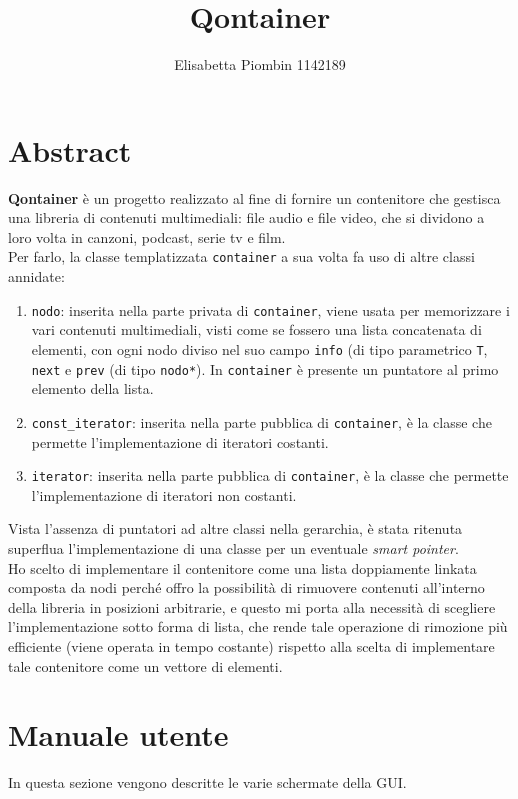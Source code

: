 \documentclass[a4paper,10pt]{article}
\begin{document}
\title {Qontainer}
\author {Elisabetta Piombin 1142189}
\date{}

\maketitle
\tableofcontents
\clearpage\mbox{}

\section{Abstract}
\textbf{Qontainer} è un progetto realizzato al fine di fornire un contenitore che gestisca una libreria di contenuti multimediali: file audio e file video, che si dividono a loro volta in canzoni, podcast, serie tv e film. \\
Per farlo, la classe templatizzata \texttt{container} a sua volta fa uso di altre classi annidate:
\begin{enumerate}
\item \texttt{nodo}: inserita nella parte privata di \texttt{container}, viene usata per memorizzare i vari contenuti multimediali, visti come se fossero una lista concatenata di elementi, con ogni nodo diviso nel suo campo \texttt{info} (di tipo parametrico \texttt{T}, \texttt{next} e \texttt{prev} (di tipo \texttt{nodo*}). In \texttt{container} è presente un puntatore al primo elemento della lista.
\item \texttt{const\_iterator}: inserita nella parte pubblica di \texttt{container}, è la classe che permette l'implementazione di iteratori costanti.
\item \texttt{iterator}: inserita nella parte pubblica di \texttt{container}, è la classe che permette l'implementazione di iteratori non costanti.
\end{enumerate}
Vista l'assenza di puntatori ad altre classi nella gerarchia, è stata ritenuta superflua l'implementazione di una classe per un eventuale \textit{smart pointer}.\\
Ho scelto di implementare il contenitore come una lista doppiamente linkata composta da nodi perché offro la possibilità di rimuovere contenuti all'interno della libreria in posizioni arbitrarie, e questo mi porta alla necessità di scegliere l'implementazione sotto forma di lista, che rende tale operazione di rimozione più efficiente (viene operata in tempo costante) rispetto alla scelta di implementare tale contenitore come un vettore di elementi.
\section{Manuale utente}
In questa sezione vengono descritte le varie schermate della GUI.\\
\end{document}
